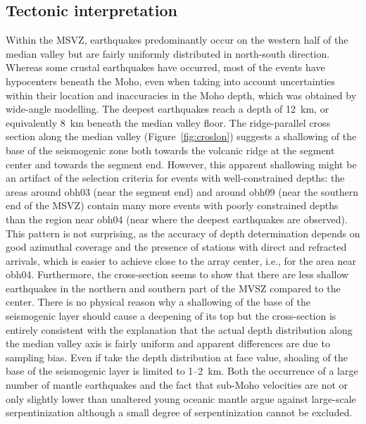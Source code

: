 \documentclass[jgr]{agu2001}
\begin{document}
\begin{article}
\subsection{Tectonic interpretation}

Within the MSVZ, earthquakes predominantly occur on the western half of the median valley but are
fairly uniformly distributed in north-south direction.  Whereas some
crustal earthquakes have occurred, most of the events have hypocenters
beneath the Moho, even when taking into account uncertainties within
their location and inaccuracies in the Moho depth, which was obtained
by wide-angle modelling.  The deepest earthquakes reach a depth of 
12~km, or equivalently 8~km beneath the median valley floor. The ridge-parallel cross section
along the median valley (Figure~\ref{fig:croslon}) suggests a
shallowing of the base of the seismogenic zone both towards the
volcanic ridge at the segment center and towards the segment end.
However, this apparent shallowing might be an artifact of the
selection criteria for events with well-constrained depths: the areas
around obh03 (near the segment end) and around obh09 (near
the southern end of the MSVZ) contain many more
events with poorly constrained depths than the region
near obh04 (near where the deepest earthquakes are observed).  This
pattern is not surprising, as the accuracy of depth determination
depends on good azimuthal coverage and the presence of stations with
direct and refracted arrivals, which is easier to achieve close to the
array center, i.e., for the area near obh04.  Furthermore, the cross-section seems to show that there are less
shallow earthquakes in the northern  and
southern part of the MVSZ compared to the center.  There is no physical reason why a shallowing of
the base of the seismogenic layer should cause a deepening of 
its top but the cross-section is entirely consistent with
the explanation that the actual depth distribution along the median
valley axis is fairly uniform and apparent differences are due to
sampling bias. Even if take the depth distribution at face value,
shoaling of the base of the seismogenic layer is limited to 1--2~km.
Both the occurrence of a large number of mantle earthquakes and the
fact that sub-Moho velocities are not or only slightly lower than
unaltered young oceanic mantle argue against large-scale
serpentinization although a small degree of serpentinization cannot be
excluded.


\end{article}
\end{document}
